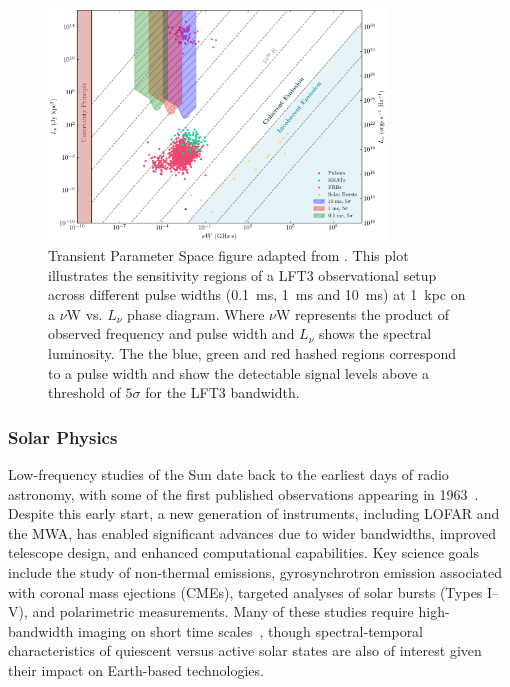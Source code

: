 \begin{figure}[!ht]
    \centering
    \includegraphics[width=0.8\textwidth]{figures/phase_space.png} 
    \caption{Transient Parameter Space figure adapted from \citet{pietka}. This plot illustrates the sensitivity regions of a LFT3 observational setup across different pulse widths (0.1~ms, 1~ms and 10~ms) at 1~kpc on a $\nu \text{W}$ vs. $L_\nu$ phase diagram. Where $\nu \text{W}$ represents the product of observed frequency and pulse width and $L_\nu$ shows the spectral luminosity. The the blue, green and red hashed regions correspond to a pulse width and show the detectable signal levels above a threshold of $5\sigma$ for the LFT3 bandwidth.}
    \label{fig:transient_space}
\end{figure}







\subsubsection{Solar Physics}
Low-frequency studies of the Sun date back to the earliest days of radio astronomy, with some of the first published observations appearing in 1963~\citep{Wild_1963}. Despite this early start, a new generation of instruments, including LOFAR and the MWA, has enabled significant advances due to wider bandwidths, improved telescope design, and enhanced computational capabilities. Key science goals include the study of non-thermal emissions, gyrosynchrotron emission associated with coronal mass ejections (CMEs), targeted analyses of solar bursts (Types I--V), and polarimetric measurements. Many of these studies require high-bandwidth imaging on short time scales~\citep{Kansabanik_2022}, though spectral-temporal characteristics of quiescent versus active solar states are also of interest given their impact on Earth-based technologies.

